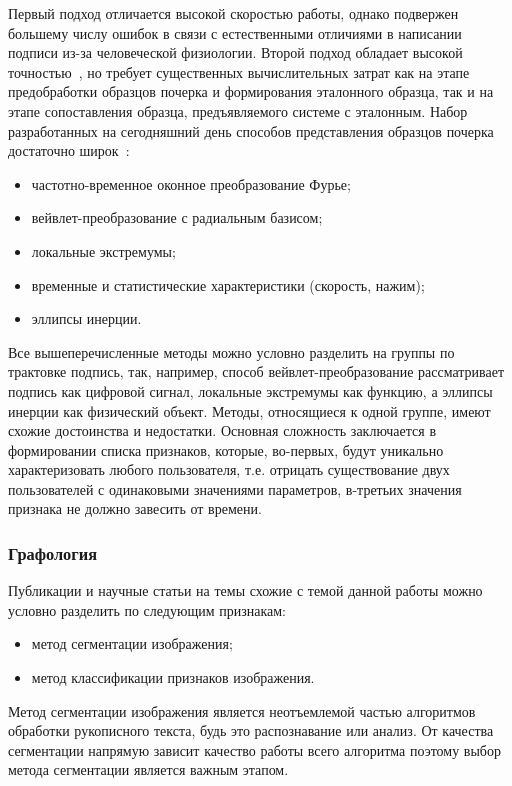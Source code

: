 Первый подход отличается высокой скоростью работы, однако подвержен большему числу ошибок в связи с естественными отличиями в написании подписи из-за человеческой физиологии.
Второй подход обладает высокой точностью~\cite{nelson_kishon}, но требует существенных вычислительных затрат как на этапе предобработки образцов почерка и формирования эталонного образца, так и на этапе сопоставления образца, предъявляемого системе с эталонным.
Набор разработанных на сегодняшний день способов представления образцов почерка достаточно широк~\cite{ivanov_korparate_network}:
\begin{itemize}
  \item частотно-временное оконное преобразование Фурье;
  \item вейвлет-преобразование с радиальным базисом;
  \item локальные экстремумы;
  \item временные и статистические характеристики (скорость, нажим);
  \item эллипсы инерции.
\end{itemize}

Все вышеперечисленные методы можно условно разделить на группы по трактовке подпись, так, например, способ вейвлет-преобразование рассматривает подпись как цифровой сигнал, локальные экстремумы как функцию, а эллипсы инерции как физический объект. Методы, относящиеся к одной группе, имеют схожие достоинства и недостатки.
Основная сложность заключается в формировании списка признаков, которые, во-первых, будут уникально характеризовать любого пользователя, т.е. отрицать существование двух пользователей с одинаковыми значениями параметров, в-третьих значения признака не должно завесить от времени.

\subsubsection{Графология}
Публикации и научные статьи на темы схожие с темой данной работы можно условно разделить по следующим признакам:
\begin{itemize}
  \item метод сегментации изображения;
  \item метод классификации признаков изображения.
\end{itemize}

Метод сегментации изображения является неотъемлемой частью алгоритмов обработки рукописного текста, будь это распознавание или анализ. От качества сегментации напрямую зависит качество работы всего алгоритма поэтому выбор метода сегментации является важным этапом.

